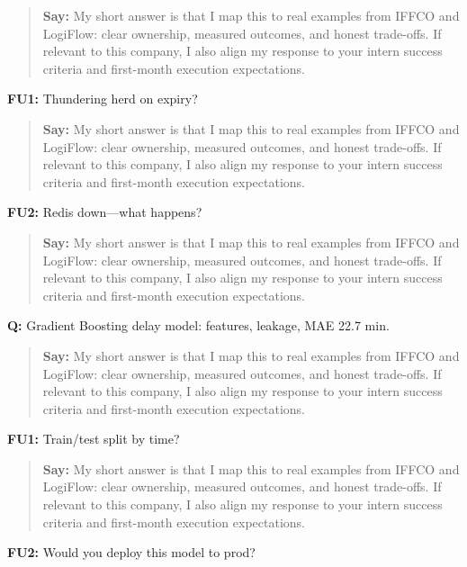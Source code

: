 \documentclass[9pt,a4paper]{article}
\begin{document}
\begin{quote}\small\textbf{Say:} My short answer is that I map this to real examples from IFFCO and LogiFlow: clear ownership, measured outcomes, and honest trade-offs. If relevant to this company, I also align my response to your intern success criteria and first-month execution expectations.\end{quote}
\vspace{2mm}
\textbf{FU1:} Thundering herd on expiry?

\begin{quote}\small\textbf{Say:} My short answer is that I map this to real examples from IFFCO and LogiFlow: clear ownership, measured outcomes, and honest trade-offs. If relevant to this company, I also align my response to your intern success criteria and first-month execution expectations.\end{quote}
\vspace{2mm}
\textbf{FU2:} Redis down---what happens?

\begin{quote}\small\textbf{Say:} My short answer is that I map this to real examples from IFFCO and LogiFlow: clear ownership, measured outcomes, and honest trade-offs. If relevant to this company, I also align my response to your intern success criteria and first-month execution expectations.\end{quote}
\vspace{2mm}
\textbf{Q:} Gradient Boosting delay model: features, leakage, MAE 22.7 min.

\begin{quote}\small\textbf{Say:} My short answer is that I map this to real examples from IFFCO and LogiFlow: clear ownership, measured outcomes, and honest trade-offs. If relevant to this company, I also align my response to your intern success criteria and first-month execution expectations.\end{quote}
\vspace{2mm}
\textbf{FU1:} Train/test split by time?

\begin{quote}\small\textbf{Say:} My short answer is that I map this to real examples from IFFCO and LogiFlow: clear ownership, measured outcomes, and honest trade-offs. If relevant to this company, I also align my response to your intern success criteria and first-month execution expectations.\end{quote}
\vspace{2mm}
\textbf{FU2:} Would you deploy this model to prod?
\end{document}

